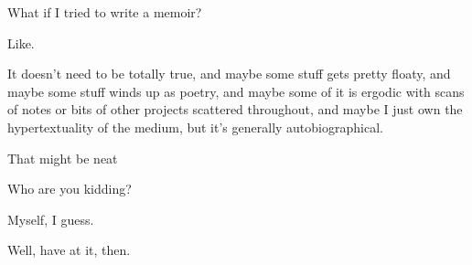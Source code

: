 What if I tried to write a memoir?

Like.

It doesn't need to be totally true, and maybe some stuff gets pretty floaty, and maybe some stuff winds up as poetry, and maybe some of it is ergodic with scans of notes or bits of other projects scattered throughout, and maybe I just own the hypertextuality of the medium, but it's generally autobiographical.

That might be neat

\begin{ally}
Who are you kidding?
\end{ally}
Myself, I guess.

\begin{ally}
Well, have at it, then.
\end{ally}
\newpage

